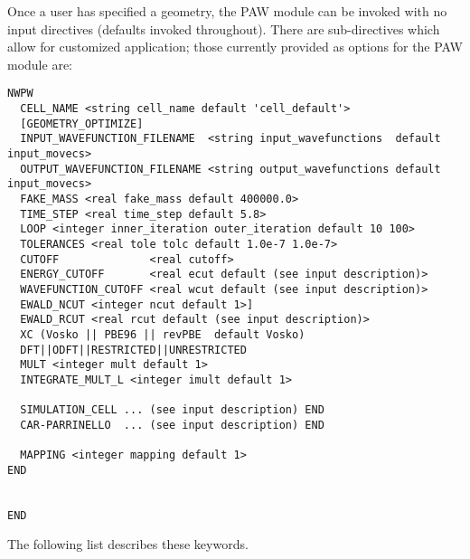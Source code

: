 Once a user has specified a geometry, the PAW module can be invoked with no input directives (defaults invoked throughout).  There are sub-directives which allow for customized application; those currently provided as options for the PAW module are:
\begin{verbatim}
NWPW
  CELL_NAME <string cell_name default 'cell_default'>  
  [GEOMETRY_OPTIMIZE]
  INPUT_WAVEFUNCTION_FILENAME  <string input_wavefunctions  default input_movecs>
  OUTPUT_WAVEFUNCTION_FILENAME <string output_wavefunctions default input_movecs>
  FAKE_MASS <real fake_mass default 400000.0>
  TIME_STEP <real time_step default 5.8>
  LOOP <integer inner_iteration outer_iteration default 10 100>
  TOLERANCES <real tole tolc default 1.0e-7 1.0e-7>
  CUTOFF              <real cutoff>
  ENERGY_CUTOFF       <real ecut default (see input description)>
  WAVEFUNCTION_CUTOFF <real wcut default (see input description)>
  EWALD_NCUT <integer ncut default 1>]
  EWALD_RCUT <real rcut default (see input description)>
  XC (Vosko || PBE96 || revPBE  default Vosko)
  DFT||ODFT||RESTRICTED||UNRESTRICTED
  MULT <integer mult default 1>
  INTEGRATE_MULT_L <integer imult default 1>
  
  SIMULATION_CELL ... (see input description) END
  CAR-PARRINELLO  ... (see input description) END

  MAPPING <integer mapping default 1>
END 


END 
\end{verbatim}
The following list describes these keywords.
